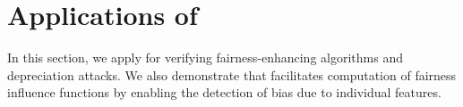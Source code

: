 \section{Applications of {\fvgm}}\label{fvgm_sec:applications}
In this section, we apply {\fvgm} for verifying fairness-enhancing algorithms and depreciation attacks. We also demonstrate that {\fvgm} facilitates computation of fairness influence functions by enabling the detection of bias due to individual features. 


